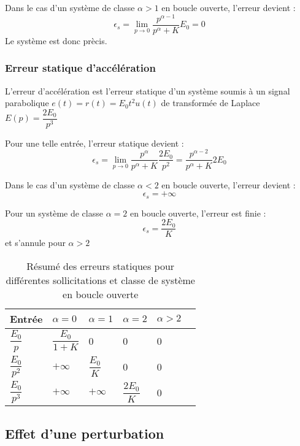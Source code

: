 Dans le cas d'un système de classe $\alpha>1$ en boucle ouverte, l'erreur devient :
$$
\epsilon_s=\lim\limits_{p\to 0}\dfrac{p^{\alpha-1}}{p^\alpha+K}E_0=0
$$
Le système est donc prècis.

\subsubsection{Erreur statique d'accélération}

L'erreur d'accélération est l'erreur statique d'un système soumis à un signal
parabolique $e(t)=r(t)=E_0t^2 u(t)$ de transformée de Laplace $E(p)=\dfrac{2E_0}{p^3}$

Pour une telle entrée, l'erreur statique devient :
$$
\epsilon_s=\lim\limits_{p\to 0} \dfrac{p^\alpha}{p^\alpha+K}\dfrac{2E_0}{p^2}=\dfrac{p^{\alpha-2}}{p^\alpha+K}2E_0 
$$

Dans le cas d'un système de classe $\alpha<2$ en boucle ouverte, l'erreur devient :
$$
\epsilon_s=+\infty
$$

Pour un système de classe $\alpha=2$ en boucle ouverte, l'erreur est finie :
$$
\epsilon_s=\dfrac{2E_0}{K}
$$
et s'annule pour $\alpha>2$

\begin{table}
	\centering
\begin{tabular}{M{2cm}M{2cm}M{2cm}M{2cm}M{2cm}N}
	\hline
	Entrée & $\alpha=0$ & $\alpha=1$ & $\alpha=2$ & $\alpha>2$ & \\[2em]
	\hline
	$\dfrac{E_0}{p}$   &  $\dfrac{E_0}{1+K}$ & 0                & 0                 & 0 & \\[2em]
	$\dfrac{E_0}{p^2}$ &  $+\infty$          & $\dfrac{E_0}{K}$ & 0                 & 0 & \\[2em]
	$\dfrac{E_0}{p^3}$ &  $+\infty$          & $+\infty$        & $\dfrac{2E_0}{K}$ & 0 & \\[2em]
	\hline
\end{tabular}
	\caption{Résumé des erreurs statiques pour différentes sollicitations et 
	classe de système en boucle ouverte}
\end{table}

\subsection{Effet d'une perturbation}

